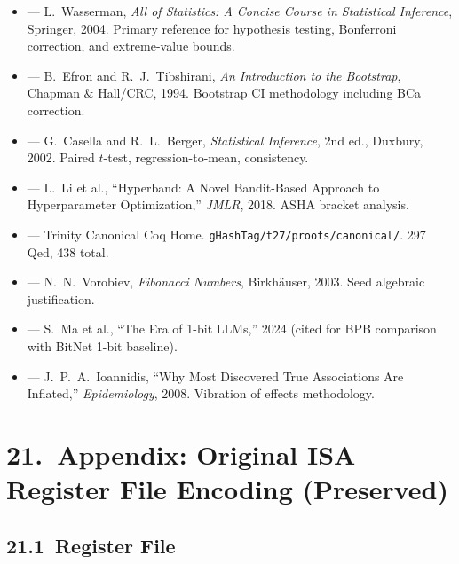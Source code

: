 \begin{itemize}
\item \cite{wasserman2004statistics} ---
  L.~Wasserman, \textit{All of Statistics: A Concise Course in
  Statistical Inference}, Springer, 2004.  Primary reference for
  hypothesis testing, Bonferroni correction, and extreme-value bounds.
\item \cite{efron1994introduction} ---
  B.~Efron and R.~J.~Tibshirani, \textit{An Introduction to the
  Bootstrap}, Chapman \& Hall/CRC, 1994.  Bootstrap CI methodology
  including BCa correction.
\item \cite{casella2002statistical} ---
  G.~Casella and R.~L.~Berger, \textit{Statistical Inference},
  2nd ed., Duxbury, 2002.  Paired \(t\)-test, regression-to-mean,
  consistency.
\item \cite{li2018hyperband} ---
  L.~Li et al., ``Hyperband: A Novel Bandit-Based Approach to
  Hyperparameter Optimization,'' \textit{JMLR}, 2018.  ASHA bracket
  analysis.
\item \cite{trinity_coq_2024} ---
  Trinity Canonical Coq Home.  \texttt{gHashTag/t27/proofs/canonical/}.
  297 Qed, 438 total.
\item \cite{vorobiev2003fibonacci} ---
  N.~N.~Vorobiev, \textit{Fibonacci Numbers}, Birkhäuser, 2003.
  Seed algebraic justification.
\item \cite{ma2024era} ---
  S.~Ma et al., ``The Era of 1-bit LLMs,'' 2024 (cited for BPB
  comparison with BitNet 1-bit baseline).
\item \cite{ioannidis2008most} ---
  J.~P.~A.~Ioannidis, ``Why Most Discovered True Associations Are
  Inflated,'' \textit{Epidemiology}, 2008.  Vibration of effects
  methodology.
\end{itemize}

\section{21.\ Appendix: Original ISA Register File Encoding (Preserved)}
\label{sec:ch26-appendix-isa}

\subsection{21.1\ Register File}


